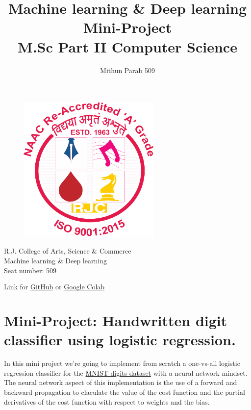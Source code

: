 \documentclass[11pt]{article}
\title{\huge{\textbf{ Machine learning \& Deep learning Mini-Project}} \\
    \LARGE{M.Sc Part II Computer Science}}
\author{Mithun Parab 509}
\begin{document}
    
\clearpage\maketitle
\thispagestyle{empty}
\begin{center}
    \begin{figure}[h]
        \centering
        \includegraphics[width=7cm]{RJCLG.png}
        \label{fig:logo}
    \end{figure}

    \large{R.J. College of Arts, Science \& Commerce \\
    Machine learning \& Deep learning\\
    Seat number: 509
    }
\end{center}
% 
\newpage
\tableofcontents
\begin{center}
    Link for \href{https://github.com/Mithunprb/SNA_Practicals_N_-Journals}{GitHub} or \href{https://colab.research.google.com/drive/1GkOTH8IbZbztvEqZ_rMvUi1EwhCzNjZ_?usp=sharing}{ Google Colab}
\end{center}
\newpage
{} %
    

    
    \hypertarget{mini-project-handwritten-digit-classifier-using-logistic-regression.}{%
\section{Mini-Project: Handwritten digit classifier using logistic
regression.}\label{mini-project-handwritten-digit-classifier-using-logistic-regression.}}

In this mini project we're going to implement from scratch a one-vs-all
logistic regression classifier for the
\href{https://drive.google.com/file/d/1lyP8UkVxEFm6cAhjYXwRUP3k3n0ddTgD/view?usp=sharing}{MNIST
digits dataset} with a neural network mindset. The neural network aspect
of this implementation is the use of a forward and backward propagation
to claculate the value of the cost function and the partial derivatives
of the cost function with respect to weights and the bias.
\end{document}
